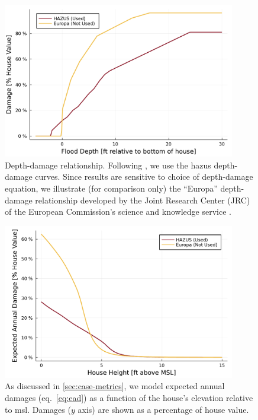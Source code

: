 \documentclass[ef,draft]{agutexSI2019}
\begin{document}
\begin{figure}
    \centering
    \includegraphics[width=4in]{cost-depth-damage}
    \caption{
        Depth-damage relationship.
        Following , we use the \gls{hazus} depth-damage curves.
        Since results are sensitive to choice of depth-damage equation, we illustrate (for comparison only) the ``Europa'' depth-damage relationship developed by the Joint Research Center (JRC) of the European Commission's science and knowledge service \cite{huizinga_depthdamage:2016}.
    }\label{fig:cost-depth-damage}
\end{figure}

\begin{figure}
    \centering
    \includegraphics[width=4in]{cost-expected-damage-emulator}
    \caption{
        As discussed in \cref{sec:case-metrics}, we model expected annual damages (eq.~\ref{eq:ead}) as a function of the house's elevation relative to \gls{msl}.
        Damages ($y$ axis) are shown as a percentage of house value.
    }\label{fig:cost-expected-damage-emulator}
\end{figure}
\end{document}
